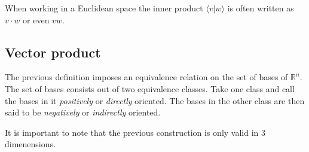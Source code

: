         \begin{notation}
			When working in a Euclidean space the inner product $\langle v|w\rangle$ is often written as $v\cdot w$ or even $vw$.
		\end{notation}
        
	\subsection{Vector product}
        \begin{result}
        	The previous definition imposes an equivalence relation on the set of bases of $\mathbb{R}^n$. The set of bases consists out of two equivalence classes. Take one class and call the bases in it \textit{positively} or \textit{directly} oriented. The bases in the other class are then said to be \textit{negatively} or \textit{indirectly} oriented.
        \end{result}
        
        \begin{remark}
        	It is important to note that the previous construction is only valid in 3 dimenensions.
        \end{remark}
